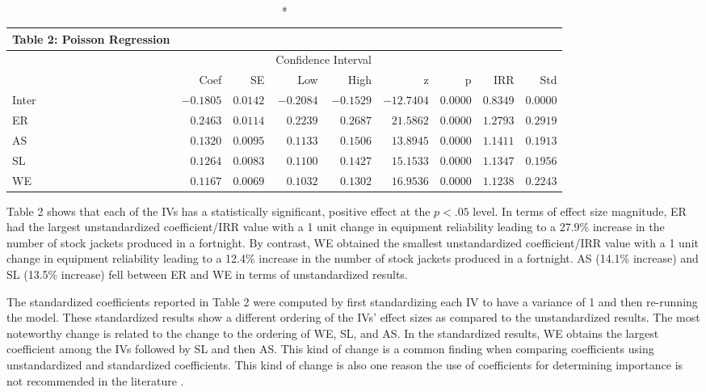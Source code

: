\documentclass[ShortAfour,times,sageapa]{sagej}
\begin{document}
	\begin{longtable}{l|rrrrrrrr}
		\caption*{
			{\large Table 2: Poisson Regression}
		} \\ 
		\toprule
		\multicolumn{1}{l}{} &  &  & \multicolumn{2}{c}{Confidence Interval} &  &  &  &  \\ 
		\cmidrule(lr){4-5}
		\multicolumn{1}{l}{} & Coef & SE & Low & High & z & p & IRR & Std \\ 
		\midrule
		Inter & $-0.1805$ & $0.0142$ & $-0.2084$ & $-0.1529$ & $-12.7404$ & $0.0000$ & $0.8349$ & $0.0000$ \\ 
		ER & $0.2463$ & $0.0114$ & $0.2239$ & $0.2687$ & $21.5862$ & $0.0000$ & $1.2793$ & $0.2919$ \\ 
		AS & $0.1320$ & $0.0095$ & $0.1133$ & $0.1506$ & $13.8945$ & $0.0000$ & $1.1411$ & $0.1913$ \\ 
		SL & $0.1264$ & $0.0083$ & $0.1100$ & $0.1427$ & $15.1533$ & $0.0000$ & $1.1347$ & $0.1956$ \\ 
		WE & $0.1167$ & $0.0069$ & $0.1032$ & $0.1302$ & $16.9536$ & $0.0000$ & $1.1238$ & $0.2243$ \\ 
		\bottomrule
	\end{longtable}

	Table 2 shows that each of the IVs has a statistically significant, positive effect at the $p < .05$ level.	
	In terms of effect size magnitude, ER had the largest unstandardized coefficient/IRR value with a 1 unit change in equipment reliability leading to a 27.9\% increase in the number of stock jackets produced in a fortnight.
	By contrast, WE obtained the smallest unstandardized coefficient/IRR value with a 1 unit change in equipment reliability leading to a 12.4\% increase in the number of stock jackets produced in a fortnight. 
	AS (14.1\% increase) and SL (13.5\% increase) fell between ER and WE in terms of unstandardized results.
	
	The standardized coefficients reported in Table 2 were computed by first standardizing each IV to have a variance of 1 and then re-running the model.
	These standardized results show a different ordering of the IVs' effect sizes as compared to the unstandardized results. 
	The most noteworthy change is related to the change to the ordering of WE, SL, and AS. In the standardized results, WE obtains the largest coefficient among the IVs followed by SL and then AS. 
	This kind of change is a common finding when comparing coefficients using unstandardized and standardized coefficients.
	This kind of change is also one reason the use of coefficients for determining importance is not recommended in the literature \cite[see]{johnson2004history}.
	
\end{document}
